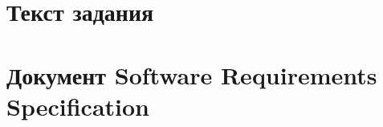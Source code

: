 \documentclass[12pt]{article}
\begin{document}

\tableofcontents
\clearpage
\section{Текст задания}

\section{Документ Software Requirements Specification}

\end{document}
